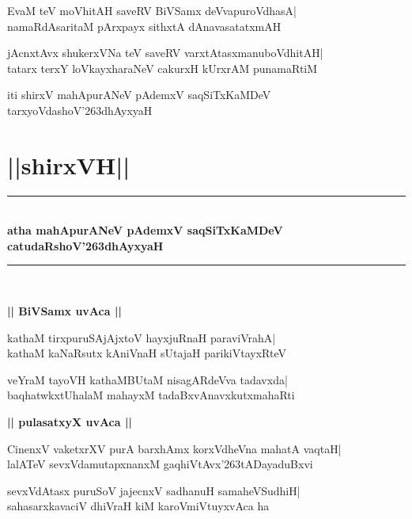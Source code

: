 \documentclass[twoside,12pt,openright]{book}
\def\S{\char'263}
\newcounter{shloka}[chapter]
\def\uvaca#1{\centerline{{\large\textbf{#1}}}}
\begin{document}
\begin{shloka}%
EvaM teV moVhitAH saveRV BiVSamx deVvapuroVdhasA|\\
namaRdAsaritaM pArxpayx sithxtA dAnavasatatxmAH
\end{shloka}

\begin{shloka}%
jAcnxtAvx shukerxVNa teV saveRV varxtAtasxmanuboVdhitAH|\\
tatarx terxY loVkayxharaNeV cakurxH kUrxrAM punamaRtiM
\end{shloka}

\begin{center}
iti shirxV mahApurANeV pAdemxV saqSiTxKaMDeV\\
 tarxyoVdashoV\S dhAyxyaH
\end{center}

\chapter{||shirxVH||}
\begin{center}
\rule{2cm}{1pt}\\[0.5cm]
{\LARGE\bfseries atha mahApurANeV pAdemxV saqSiTxKaMDeV}\\[.3cm]
{\LARGE\bfseries catudaRshoV\S dhAyxyaH}\\[.3cm]
\rule{2cm}{1pt}\\
\end{center}

\uvaca{|| BiVSamx uvAca ||}
\begin{shloka}%
kathaM tirxpuruSAjAjxtoV hayxjuRnaH paraviVrahA|\\
kathaM kaNaRsutx kAniVnaH sUtajaH parikiVtayxRteV
\end{shloka}

\begin{shloka}%
veYraM tayoVH kathaMBUtaM nisagARdeVva tadavxda|\\
baqhatwkxtUhalaM mahayxM tadaBxvAnavxkutxmahaRti
\end{shloka}

\uvaca{|| pulasatxyX uvAca ||}
\begin{shloka}%
CinenxV vaketxrXV purA barxhAmx korxVdheVna mahatA vaqtaH|\\
lalATeV sevxVdamutapxnanxM gaqhiVtAvx\S tADayaduBxvi
\end{shloka}

\begin{shloka}%
sevxVdAtasx puruSoV jajecnxV sadhanuH samaheVSudhiH|\\
sahasarxkavaciV dhiVraH kiM karoVmiVtuyxvAca ha
\end{shloka}
\end{document}
